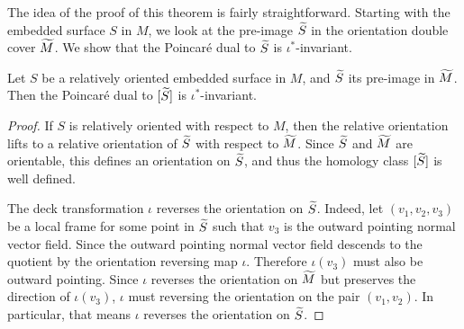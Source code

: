 The idea of the proof of this theorem is fairly straightforward. Starting with the embedded surface
$S$ in $M$, we look at the pre-image $\widetilde{S}$ in the orientation double cover $\widetilde{M}$. We show
that the Poincar\'e dual to $\widetilde{S}$ is $\iota^{\ast}$-invariant.
\begin{lem}
  \label{lem:PD1}
  Let $S$ be a relatively oriented embedded surface in $M$, and $\widetilde{S}$ its pre-image in
  $\widetilde{M}$. Then the Poincar\'e dual to $[\widetilde{S}]$ is $\iota^{\ast}$-invariant.
\end{lem}
\begin{proof}
  If $S$ is relatively oriented with respect to $M$, then the relative orientation lifts to a relative orientation of $\widetilde{S}$ with respect to $\widetilde{M}$. Since $\widetilde{S}$ and $\widetilde{M}$ are orientable, this defines an orientation on $\widetilde{S}$,
  and thus the homology class $[\widetilde{S}]$ is well defined.

  The deck transformation $\iota$ reverses the orientation on $\widetilde{S}$. Indeed, let $(v_1, v_2, v_3)$ be a local frame for some point in $\widetilde{S}$ such that
  $v_3$ is the outward pointing normal vector field. Since the outward pointing normal vector
  field descends to the quotient by the orientation reversing map $\iota$.  Therefore $\iota(v_3)$
  must also be outward pointing. Since $\iota$ reverses the
  orientation on $\widetilde{M}$ but preserves the direction of $\iota(v_3)$, $\iota$ must reversing the orientation on the pair
  $(v_1, v_2)$. In particular, that means $\iota$ reverses the orientation on $\widetilde{S}$.


\end{proof}
